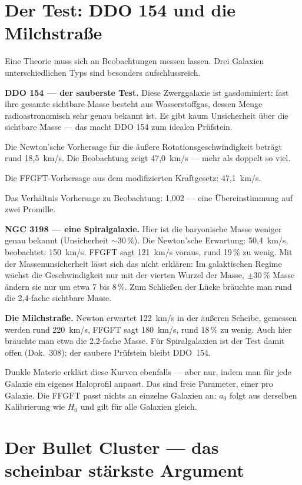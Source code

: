 \documentclass[11pt,oneside]{book}
\begin{document}
\chapter{Der Test: DDO 154 und die Milchstraße}

Eine Theorie muss sich an Beobachtungen messen lassen. Drei
Galaxien unterschiedlichen Typs sind besonders aufschlussreich.

\textbf{DDO 154 — der sauberste Test.}
Diese Zwerggalaxie ist gasdominiert: fast ihre gesamte
sichtbare Masse besteht aus Wasserstoffgas, dessen Menge
radioastronomisch sehr genau bekannt ist. Es gibt kaum
Unsicherheit über die sichtbare Masse — das macht DDO 154
zum idealen Prüfstein.

Die Newton'sche Vorhersage für die äußere Rotationsgeschwindigkeit
beträgt rund 18,5~km/s. Die Beobachtung zeigt 47,0~km/s —
mehr als doppelt so viel.

Die FFGFT-Vorhersage aus dem modifizierten Kraftgesetz: 47,1~km/s.

Das Verhältnis Vorhersage zu Beobachtung: 1,002 — eine
Übereinstimmung auf zwei Promille.

\textbf{NGC 3198 — eine Spiralgalaxie.}
Hier ist die baryonische Masse weniger genau bekannt (Unsicherheit
$\sim 30\,\%$). Die Newton'sche Erwartung: 50,4~km/s,
beobachtet: 150~km/s. FFGFT sagt 121~km/s voraus, rund
19\,\% zu wenig. Mit der Massenunsicherheit lässt sich das
nicht erklären: Im galaktischen Regime wächst die Geschwindigkeit
nur mit der vierten Wurzel der Masse, $\pm30\,\%$ Masse ändern
sie nur um etwa $7$ bis $8\,\%$. Zum Schließen der Lücke bräuchte
man rund die 2,4-fache sichtbare Masse.

\textbf{Die Milchstraße.}
Newton erwartet 122~km/s in der äußeren Scheibe, gemessen
werden rund 220~km/s, FFGFT sagt 180~km/s, rund 18\,\% zu
wenig. Auch hier bräuchte man etwa die 2,2-fache Masse.
Für Spiralgalaxien ist der Test damit offen (Dok.~308); der
saubere Prüfstein bleibt DDO~154.

\medskip
Dunkle Materie erklärt diese Kurven ebenfalls — aber nur,
indem man für jede Galaxie ein eigenes Haloprofil anpasst.
Das sind freie Parameter, einer pro Galaxie. Die FFGFT passt
nichts an einzelne Galaxien an: $a_0$ folgt aus derselben
Kalibrierung wie $H_0$ und gilt für alle Galaxien gleich.

\chapter{Der Bullet Cluster — das scheinbar stärkste Argument}
\end{document}
